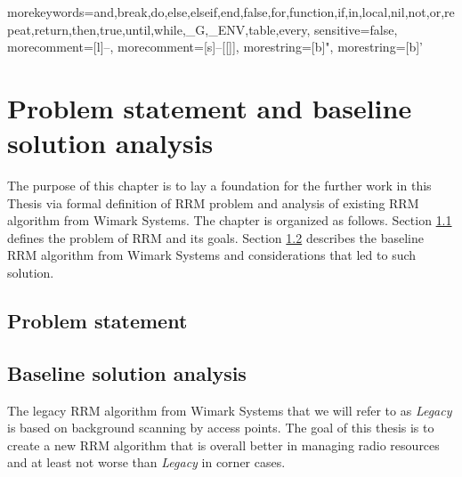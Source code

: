 

{
morekeywords={and,break,do,else,elseif,end,false,for,function,if,in,local,nil,not,or,repeat,return,then,true,until,while,_G,_ENV,table,every},
sensitive=false,
morecomment=[l]{--},
morecomment=[s]{--[[}{]]},
morestring=[b]",
morestring=[b]'
}

\lstset{style=mystyle}


\chapter{Problem statement and baseline solution analysis}
\label{chap:met}


The purpose of this chapter is to lay a foundation for the further work in this Thesis via formal definition of RRM problem and analysis of existing RRM algorithm from Wimark Systems. The chapter is organized as follows. Section \ref{sec:prob} defines the problem of RRM and its goals. Section \ref{sec:baseline} describes the baseline RRM algorithm from Wimark Systems and considerations that led to such solution.


\section{Problem statement}
\label{sec:prob}


\section{Baseline solution analysis}
\label{sec:baseline}
The legacy RRM algorithm from Wimark Systems that we will refer to as \textit{Legacy} is based on background scanning by access points. The goal of this thesis is to create a new RRM algorithm that is overall better in managing radio resources and at least not worse than \textit{Legacy} in corner cases.

